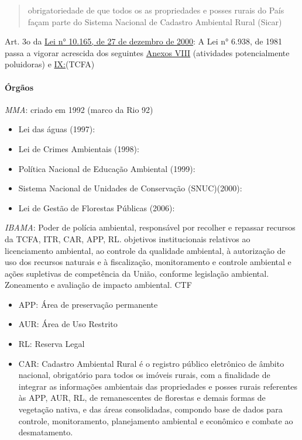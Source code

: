 \documentclass[
]{article}
\providecommand{\tightlist}{%
  \setlength{\itemsep}{0pt}\setlength{\parskip}{0pt}}
\begin{document}
\begin{itemize}
\begin{itemize}
    \begin{quote}
    obrigatoriedade de que todos os as propriedades e posses rurais do
    País façam parte do Sistema Nacional de Cadastro Ambiental Rural
    (Sicar)
    \end{quote}

    Art. 3o da
    \href{https://www.planalto.gov.br/ccivil_03/LEIS/L10165.htm\#art1}{Lei
    n° 10.165, de 27 de dezembro de 2000}: A Lei n° 6.938, de 1981 passa
    a vigorar acrescida dos seguintes
    \href{https://www.planalto.gov.br/ccivil_03/LEIS/L10165.htm\#anexoviii}{Anexos
    VIII} (atividades potencialmente poluidoras) e
    \href{https://www.planalto.gov.br/ccivil_03/LEIS/L10165.htm\#anexoix}{IX:}(TCFA)
  \end{itemize}

  \hypertarget{uxf3rguxe3os}{%
  \paragraph{Órgãos}\label{uxf3rguxe3os}}

  \emph{MMA}: criado em 1992 (marco da Rio 92)

  \begin{itemize}
  \item
    Lei das águas (1997):
  \item
    Lei de Crimes Ambientais (1998):
  \item
    Política Nacional de Educação Ambiental (1999):
  \item
    Sistema Nacional de Unidades de Conservação (SNUC)(2000):
  \item
    Lei de Gestão de Florestas Públicas (2006):
  \end{itemize}

  \emph{IBAMA}: Poder de polícia ambiental, responsável por recolher e
  repassar recursos da TCFA, ITR, CAR, APP, RL. objetivos institucionais
  relativos ao licenciamento ambiental, ao controle da qualidade
  ambiental, à autorização de uso dos recursos naturais e à
  fiscalização, monitoramento e controle ambiental e ações supletivas de
  competência da União, conforme legislação ambiental. Zoneamento e
  avaliação de impacto ambiental. CTF

  \begin{itemize}
  \tightlist
  \item
    APP: Área de preservação permanente
  \item
    AUR: Área de Uso Restrito
  \item
    RL: Reserva Legal
  \item
    CAR: Cadastro Ambiental Rural é o registro público eletrônico de
    âmbito nacional, obrigatório para todos os imóveis rurais, com a
    finalidade de integrar as informações ambientais das propriedades e
    posses rurais referentes às APP, AUR, RL, de remanescentes de
    florestas e demais formas de vegetação nativa, e das áreas
    consolidadas, compondo base de dados para controle, monitoramento,
    planejamento ambiental e econômico e combate ao desmatamento.


\end{itemize}
\end{itemize}
\end{document}
